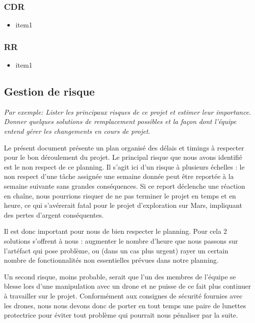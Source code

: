 \documentclass{mistcoursedoc}
\begin{document}
\subsubsection{CDR}
\begin{itemize}
  \item item1
\end{itemize}

\subsubsection{RR}
\begin{itemize}
  \item item1
\end{itemize}

\subsection{Gestion de risque}

\textit{Par exemple: Lister les principaux risques de ce projet et estimer leur importance.  Donner quelques solutions de remplacement possibles et la façon dont l’équipe entend gérer les changements en cours de projet.}

Le présent document présente un plan organisé des délais et timings à respecter pour le bon déroulement du projet. Le principal risque que nous avons identifié est le non respect de ce planning. Il s'agit ici d'un risque à plusieurs échelles : le non respect d'une tâche assignée une semaine donnée peut être reportée à la semaine suivante sans grandes conséquences. Si ce report déclenche une réaction en chaîne, nous pourrions risquer de ne pas terminer le projet en temps et en heure, ce qui s'avérerait fatal pour le projet d'exploration sur Mars, impliquant des pertes d'argent conséquentes.

Il est donc important pour nous de bien respecter le planning. Pour cela 2 solutions s'offrent à nous : augmenter le nombre d'heure que nous passons sur l'artéfact qui pose problème, ou (dans un cas plus urgent) rayer un certain nombre de fonctionnalités non essentielles prévues dans notre planning.

Un second risque, moins probable, serait que l'un des membres de l'équipe se blesse lors d'une manipulation avec un drone et ne puisse de ce fait plus continuer à travailler sur le projet. Conformément aux consignes de sécurité fournies avec les drones, nous nous devons donc de porter en tout temps une paire de lunettes protectrice pour éviter tout problème qui pourrait nous pénaliser par la suite.
\end{document}
